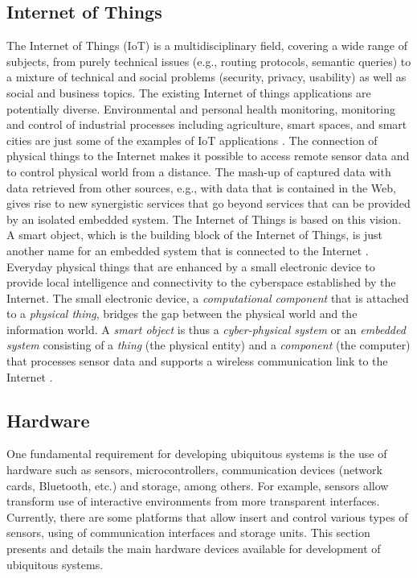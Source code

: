 \documentclass{acm_proc_article-sp}
\begin{document}
\subsection{Internet of Things}
The Internet of Things (IoT) is a multidisciplinary field, covering a wide range of subjects, from purely technical issues (e.g., routing protocols, semantic queries) to a mixture of technical and social problems (security, privacy, usability) as well as social and business topics. The existing Internet of things applications are potentially diverse. Environmental and personal health monitoring, monitoring and control of industrial processes including agriculture, smart spaces, and smart cities are just some of the examples of IoT applications \cite{krishnakumarframework}.
\newline
\newline
The connection of physical things to the Internet makes it possible to access remote sensor data and to control physical world from a distance. The mash-up of captured data with data retrieved from other sources, e.g., with data that is contained in the Web, gives rise to new synergistic services that go beyond services that can be provided by an isolated embedded system. The Internet of Things is based on this vision. A smart object, which is the building block of the Internet of Things, is just another name for an embedded system that is connected to the Internet \cite{Kopetz:1997}.
\newline
\newline
Everyday physical things that are enhanced by a small electronic device to provide local intelligence and connectivity to the cyberspace established by the Internet. The small electronic device, a \textit{computational component} that is attached to a \textit{physical thing}, bridges the gap between the physical world and the information world. A \textit{smart object} is thus a \textit{cyber-physical system} or an \textit{embedded system} consisting of a \textit{thing} (the physical entity) and a \textit{component} (the computer) that processes sensor data and supports a wireless communication link to the Internet \cite{Kopetz:1997}.

\subsection{Hardware}
One fundamental requirement for developing ubiquitous systems is the use of hardware such as sensors, microcontrollers, communication devices (network cards, Bluetooth, etc.) and storage, among others. For example, sensors allow transform use of interactive environments from more transparent interfaces. Currently, there are some platforms that allow insert and control various types of sensors, using of communication interfaces and storage units. This section presents and details the main hardware devices available for development of ubiquitous systems.
\end{document}

